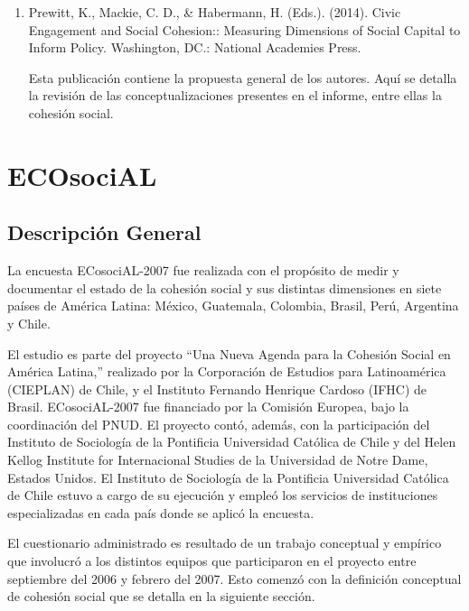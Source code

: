 \documentclass[
  12pt,
]{book}
\begin{document}
\begin{enumerate}
\def\labelenumi{\arabic{enumi}.}
\item
  Prewitt, K., Mackie, C. D., \& Habermann, H. (Eds.). (2014). Civic
  Engagement and Social Cohesion:: Measuring Dimensions of Social
  Capital to Inform Policy. Washington, DC.: National Academies
  Press.

  Esta publicación contiene la propuesta general de los autores. Aquí se detalla la revisión de las conceptualizaciones presentes en el informe, entre ellas la cohesión social.
\end{enumerate}

\hypertarget{ecosocial}{%
\chapter{ECOsociAL}\label{ecosocial}}

\hypertarget{descripciuxf3n-general-4}{%
\section{Descripción General}\label{descripciuxf3n-general-4}}

La encuesta ECosociAL-2007 fue realizada con el propósito de medir y documentar el estado de la cohesión social y sus distintas dimensiones en siete países de América Latina: México, Guatemala, Colombia, Brasil, Perú, Argentina y Chile.

El estudio es parte del proyecto ``Una Nueva Agenda para la Cohesión Social en América Latina,'' realizado por la Corporación de Estudios para Latinoamérica (CIEPLAN) de Chile, y el Instituto Fernando Henrique Cardoso (IFHC) de Brasil. ECosociAL-2007 fue financiado por la Comisión Europea, bajo la coordinación del PNUD. El proyecto contó, además, con la participación del Instituto de Sociología de la Pontificia Universidad Católica de Chile y del Helen Kellog Institute for Internacional Studies de la Universidad de Notre Dame, Estados Unidos. El Instituto de Sociología de la Pontificia Universidad Católica de Chile estuvo a cargo de su ejecución y empleó los servicios de instituciones especializadas en cada país donde se aplicó la encuesta.

El cuestionario administrado es resultado de un trabajo conceptual y empírico que involucró a los distintos equipos que participaron en el proyecto entre septiembre del 2006 y febrero del 2007. Esto comenzó con la definición conceptual de cohesión social que se detalla en la siguiente sección.
\end{document}
